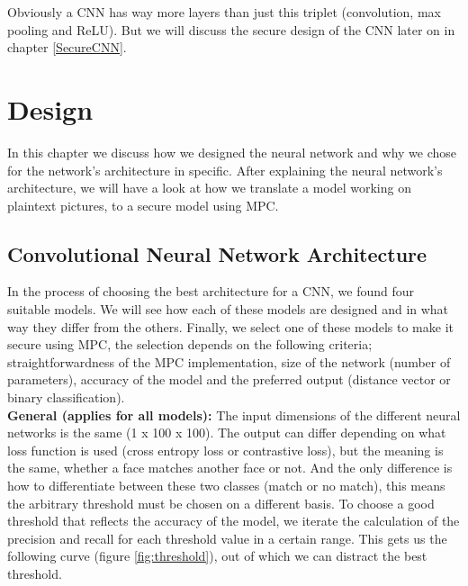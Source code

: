 Obviously a CNN has way more layers than just this triplet (convolution, max pooling and ReLU). But we will discuss the secure design of the CNN later on in chapter \ref{SecureCNN}.

\section{Design}
\label{Design}
In this chapter we discuss how we designed the neural network and why we chose for the network's architecture in specific. After explaining the neural network's architecture, we will have a look at how we translate a model working on plaintext pictures, to a secure model using MPC.

\subsection{Convolutional Neural Network Architecture}
\label{ConvolutionalNeuralNetworkArchitecture}
In the process of choosing the best architecture for a CNN, we found four suitable models. We will see how each of these models are designed and in what way they differ from the others. Finally, we select one of these models to make it secure using MPC, the selection depends on the following criteria; straightforwardness of the MPC implementation, size of the network (number of parameters), accuracy of the model and the preferred output (distance vector or binary classification).\\

\textbf{General (applies for all models):} The input dimensions of the different neural networks is the same (1 x 100 x 100). The output can differ depending on what loss function is used (cross entropy loss or contrastive loss), but the meaning is the same, whether a face matches another face or not. And the only difference is how to differentiate between these two classes (match or no match), this means the arbitrary threshold must be chosen on a different basis. To choose a good threshold that reflects the accuracy of the model, we iterate the calculation of the precision and recall for each threshold value in a certain range. This gets us the following curve (figure \ref{fig:threshold}), out of which we can distract the best threshold.\\


